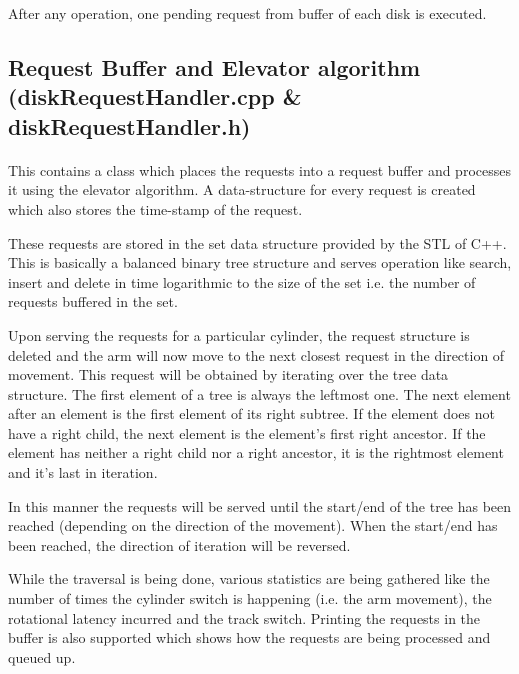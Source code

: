 \documentclass[11pt]{article}
\begin{document}
After any operation, one pending request from buffer of each disk is executed.

\subsection{Request Buffer and Elevator algorithm \\ (diskRequestHandler.cpp \& diskRequestHandler.h)}
\paragraph{}

This contains a class which places the requests into a request buffer and processes it using the elevator algorithm. A data-structure for every request is created which also stores the time-stamp of the request.

These requests are stored in the set data structure provided by the STL of C++. This is basically a balanced binary tree structure and serves operation like search, insert and delete in time logarithmic to the size of the set i.e. the number of requests buffered in the set.

Upon serving the requests for a particular cylinder, the request structure is deleted and the arm will now move to the next closest request in the direction of movement. This request will be obtained by iterating over the tree data structure. The first element of a tree is always the leftmost one. The next element after an element is the first element of its right subtree. If the element does not have a right child, the next element is the element's first right ancestor. If the element has neither a right child nor a right ancestor, it is the rightmost element and it's last in iteration. 

In this manner the requests will be served until the start/end of the tree has been reached (depending on the direction of the movement). When the start/end has been reached, the direction of iteration will be reversed.

While the traversal is being done, various statistics are being gathered like the number of times the cylinder switch is happening (i.e. the arm movement), the rotational latency incurred and the track switch. Printing the requests in the buffer is also supported which shows how the requests are being processed and queued up.
\end{document}
